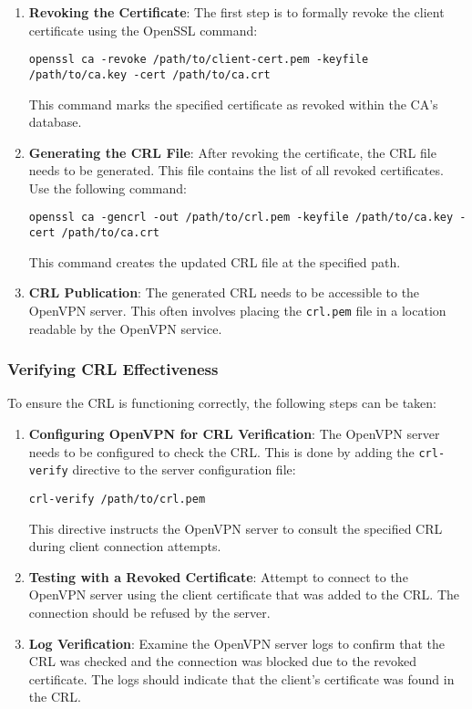 \begin{enumerate}
\item \textbf{Revoking the Certificate}: The first step is to formally revoke the client certificate using the OpenSSL command:
\begin{verbatim}
openssl ca -revoke /path/to/client-cert.pem -keyfile /path/to/ca.key -cert /path/to/ca.crt
\end{verbatim}
This command marks the specified certificate as revoked within the CA's database.

\item \textbf{Generating the CRL File}: After revoking the certificate, the CRL file needs to be generated. This file contains the list of all revoked certificates. Use the following command:
\begin{verbatim}
openssl ca -gencrl -out /path/to/crl.pem -keyfile /path/to/ca.key -cert /path/to/ca.crt
\end{verbatim}
This command creates the updated CRL file at the specified path.

\item \textbf{CRL Publication}: The generated CRL needs to be accessible to the OpenVPN server. This often involves placing the \texttt{crl.pem} file in a location readable by the OpenVPN service.

\end{enumerate}

\subsubsection{Verifying CRL Effectiveness}

To ensure the CRL is functioning correctly, the following steps can be taken:

\begin{enumerate}
\item \textbf{Configuring OpenVPN for CRL Verification}: The OpenVPN server needs to be configured to check the CRL. This is done by adding the \texttt{crl-verify} directive to the server configuration file:
\begin{verbatim}
crl-verify /path/to/crl.pem
\end{verbatim}
This directive instructs the OpenVPN server to consult the specified CRL during client connection attempts.

\item \textbf{Testing with a Revoked Certificate}: Attempt to connect to the OpenVPN server using the client certificate that was added to the CRL. The connection should be refused by the server.

\item \textbf{Log Verification}: Examine the OpenVPN server logs to confirm that the CRL was checked and the connection was blocked due to the revoked certificate. The logs should indicate that the client's certificate was found in the CRL.

\end{enumerate}

